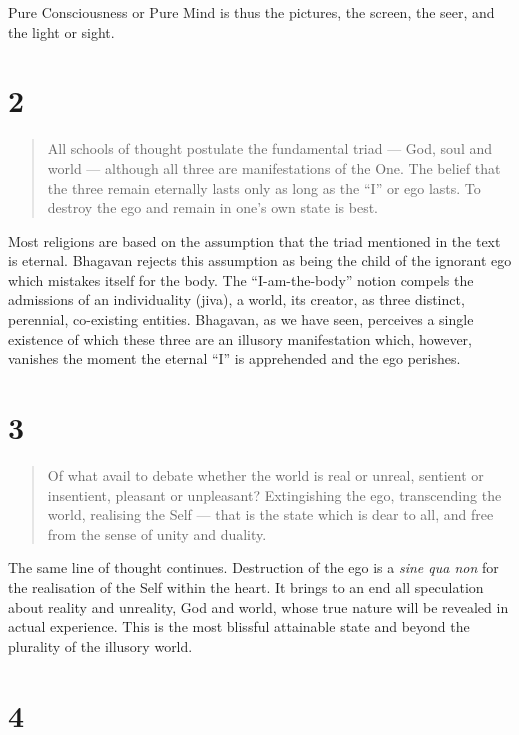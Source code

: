 \documentclass[12pt]{report}
\begin{document}
Pure Consciousness or Pure Mind is thus the pictures, the screen, the
seer, and the light or sight.

\section*{2}

\begin{quote}
All schools of thought postulate the fundamental triad --- God, soul
and world --- although all three are manifestations of the One. The
belief that the three remain eternally lasts only as long as the ``I''
or ego lasts. To destroy the ego and remain in one's own state is best.
\end{quote}


Most religions are based on the assumption that the triad mentioned in
the text is eternal. Bhagavan rejects this assumption as being the
child of the ignorant ego which mistakes itself for the body. The
``I-am-the-body'' notion compels the admissions of an individuality
(jiva), a world, its creator, as three distinct, perennial,
co-existing entities. Bhagavan, as we have seen, perceives a single
existence of which these three are an illusory manifestation which,
however, vanishes the moment the eternal ``I'' is apprehended and the
ego perishes.

\section*{3}

\begin{quote}
Of what avail to debate whether the world is real or unreal, sentient
or insentient, pleasant or unpleasant? Extingishing the ego,
transcending the world, realising the Self --- that is the state which
is dear to all, and free from the sense of unity and duality.
\end{quote}


The same line of thought continues. Destruction of the ego is a
\emph{sine qua non} for the realisation of the Self within the
heart. It brings to an end all speculation about reality and
unreality, God and world, whose true nature will be revealed in actual
experience. This is the most blissful attainable state and beyond the
plurality of the illusory world.

\section*{4}
\end{document}
